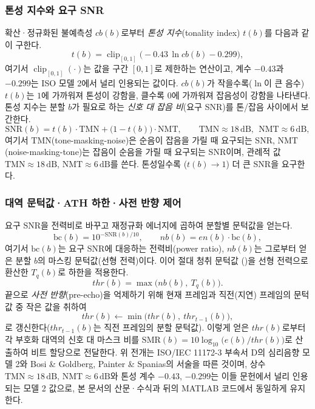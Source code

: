 \documentclass[11pt,a4paper]{article}
\newcommand{\dB}{\ensuremath{\,\mathrm{dB}}}          %
\newcommand{\ATH}{T_{q}}                               %
\newcommand{\SMR}{\mathrm{SMR}}                        %
\newcommand{\SNR}{\mathrm{SNR}}                        %
\begin{document}
\subsubsection{톤성 지수와 요구 SNR}
확산·정규화된 불예측성 $\mathit{cb}(b)$로부터 \emph{톤성 지수}(tonality index)
$t(b)$를 다음과 같이 구한다.
\begin{equation}\label{eq:tonality}
  t(b) = \operatorname{clip}_{[0,1]}\!\bigl(-0.43\,\ln \mathit{cb}(b) - 0.299\bigr),
\end{equation}
여기서 $\operatorname{clip}_{[0,1]}(\cdot)$는 값을 구간 $[0,1]$로 제한하는 연산이고,
계수 $-0.43$과 $-0.299$는 ISO 모델 2에서 널리 인용되는 값이다. $\mathit{cb}(b)$가
작을수록($\ln$이 큰 음수) $t(b)$는 $1$에 가까워져 톤성이 강함을, 클수록 $0$에
가까워져 잡음성이 강함을 나타낸다. 톤성 지수는 분할 $b$가 필요로 하는 \emph{신호 대
잡음 비}(요구 SNR)를 톤/잡음 사이에서 보간한다.
\begin{equation}\label{eq:snrreq}
  \SNR(b) = t(b)\cdot \mathrm{TMN} + \bigl(1 - t(b)\bigr)\cdot \mathrm{NMT},
  \qquad
  \mathrm{TMN} \approx 18\dB,\ \ \mathrm{NMT} \approx 6\dB,
\end{equation}
여기서 $\mathrm{TMN}$(tone-masking-noise)은 순음이 잡음을 가릴 때 요구되는 SNR,
$\mathrm{NMT}$(noise-masking-tone)는 잡음이 순음을 가릴 때 요구되는 SNR이며, 관례적
값 $\mathrm{TMN}\approx 18\dB$, $\mathrm{NMT}\approx 6\dB$를 쓴다. 톤성일수록
($t(b)\to 1$) 더 큰 SNR을 요구한다.

\subsubsection{대역 문턱값·ATH 하한·사전 반향 제어}
요구 SNR을 전력비로 바꾸고 재정규화 에너지에 곱하여 분할별 문턱값을 얻는다.
\begin{equation}\label{eq:nb}
  \mathrm{bc}(b) = 10^{-\SNR(b)/10},
  \qquad
  \mathit{nb}(b) = \mathit{en}(b)\cdot \mathrm{bc}(b),
\end{equation}
여기서 $\mathrm{bc}(b)$는 요구 SNR에 대응하는 전력비(power ratio), $\mathit{nb}(b)$는
그로부터 얻은 분할 $b$의 마스킹 문턱값(선형 전력)이다. 이어 절대 청취 문턱값
()을 선형 전력으로 환산한 $\ATH(b)$로 하한을 적용한다.
\begin{equation}\label{eq:pam2floor}
  \mathit{thr}(b) = \max\bigl(\mathit{nb}(b),\ \ATH(b)\bigr).
\end{equation}
끝으로 \emph{사전 반향}(pre-echo)을 억제하기 위해 현재 프레임과 직전(지연) 프레임의
문턱값 중 작은 값을 취하여
\begin{equation}\label{eq:pam2preecho}
  \mathit{thr}(b) \leftarrow \min\bigl(\mathit{thr}(b),\ \mathit{thr}_{t-1}(b)\bigr),
\end{equation}
로 갱신한다($\mathit{thr}_{t-1}(b)$는 직전 프레임의 분할 문턱값). 이렇게 얻은
$\mathit{thr}(b)$로부터 각 부호화 대역의 신호 대 마스크 비를 $\SMR(b) =
10\log_{10}\bigl(e(b)/\mathit{thr}(b)\bigr)$로 산출하여 비트 할당으로 전달한다. 위
전개는 ISO/IEC 11172-3 부속서 D의 심리음향 모델 2\cite{iso11172}와 Bosi \&
Goldberg\cite{bosi}, Painter \& Spanias\cite{painter}의 서술을 따른 것이며, 상수
$\mathrm{TMN}\approx 18\dB$, $\mathrm{NMT}\approx 6\dB$와 톤성 계수 $-0.43$,
$-0.299$는 이들 문헌에서 널리 인용되는 모델 2 값으로, 본 문서의 산문·수식과 뒤의
MATLAB 코드에서 동일하게 유지한다.
\end{document}
